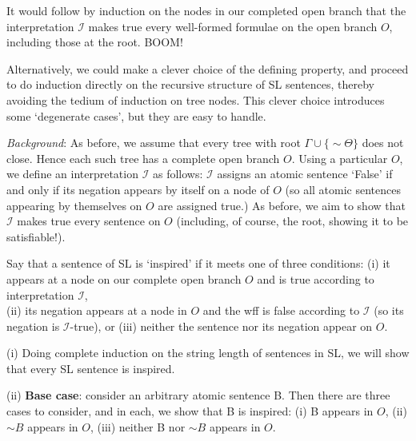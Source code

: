 \documentclass[12pt]{article}
\def\enot{\ensuremath{{\sim}}} %
\let\oldsim\sim %
\renewcommand{\sim}{{\oldsim}} %
\newcommand*{\metav}[1]{\ensuremath{\mathcal{#1}}}
\begin{document}
\begin{enumerate}
It would follow by induction on the nodes in our completed open branch that the interpretation \metav{I} makes true every well-formed formulae on the open branch $O$, including those at the root. BOOM! \\


\newpage


Alternatively, we could make a clever choice of the defining property, and proceed to do induction directly on the recursive structure of SL sentences, thereby avoiding the tedium of induction on tree nodes. This clever choice introduces some `degenerate cases', but they are easy to handle.

\textit{Background}: As before, we assume that every tree with root $\Gamma \cup \{\enot \Theta \}$ does not close. Hence each such tree has a complete open branch $O$. Using a particular $O$, we define an interpretation \metav{I} as follows: \metav{I} assigns an atomic sentence `False' if and only if its negation appears by itself on a node of $O$ (so all atomic sentences appearing by themselves on $O$ are assigned true.) As before, we aim to show that \metav{I} makes true every sentence on $O$ (including, of course, the root, showing it to be satisfiable!).  

Say that a sentence of SL is `inspired' if it meets one of three conditions: (i) it appears at a node on our complete open branch $O$ and is true according to interpretation \metav{I}, \\ (ii) its negation appears at a node in $O$ and the wff is false according to \metav{I} (so its negation is \metav{I}-true), or (iii) neither the sentence nor its negation appear on $O$. 

(i) Doing complete induction on the string length of sentences in SL, we will show that every SL sentence is inspired. %

(ii) \textbf{Base case}: consider an arbitrary atomic sentence B. Then there are three cases to consider, and in each, we show that B is inspired: (i) B appears in $O$, (ii) $\enot B$ appears in $O$, (iii) neither B nor $\enot B$ appears in $O$. 


\end{enumerate}
\end{document}
